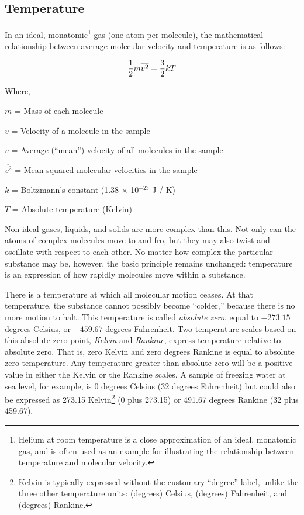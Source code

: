 \filbreak
\subsection{Temperature}

In an ideal, monatomic\footnote{Helium at room temperature is a close approximation of an ideal, monatomic gas, and is often used as an example for illustrating the relationship between temperature and molecular velocity.} gas (one atom per molecule), the mathematical relationship between average molecular velocity and temperature is as follows:

$${1 \over 2}m\overline{v^2} = {3 \over 2}kT$$

\noindent
Where,

$m$ = Mass of each molecule

$v$ = Velocity of a molecule in the sample

$\overline{v}$ = Average (``mean'') velocity of all molecules in the sample

$\overline{v^2}$ = Mean-squared molecular velocities in the sample

$k$ = Boltzmann's constant (1.38 $\times$ 10$^{-23}$ J / K)

$T$ = Absolute temperature (Kelvin)

\vskip 10pt

Non-ideal gases, liquids, and solids are more complex than this.  Not only can the atoms of complex molecules move to and fro, but they may also twist and oscillate with respect to each other.  No matter how complex the particular substance may be, however, the basic principle remains unchanged: temperature is an expression of how rapidly molecules move within a substance.  

There is a temperature at which all molecular motion ceases.  At that temperature, the substance cannot possibly become ``colder,'' because there is no more motion to halt.  This temperature is called \textit{absolute zero}, equal to $-273.15$ degrees Celsius, or $-459.67$ degrees Fahrenheit.  Two temperature scales based on this absolute zero point, \textit{Kelvin} and \textit{Rankine}, express temperature relative to absolute zero.  That is, zero Kelvin and zero degrees Rankine is equal to absolute zero temperature.  Any temperature greater than absolute zero will be a positive value in either the Kelvin or the Rankine scales.  A sample of freezing water at sea level, for example, is 0 degrees Celsius (32 degrees Fahrenheit) but could also be expressed as 273.15 Kelvin\footnote{Kelvin is typically expressed without the customary ``degree'' label, unlike the three other temperature units: (degrees) Celsius, (degrees) Fahrenheit, and (degrees) Rankine.} (0 plus 273.15) or 491.67 degrees Rankine (32 plus 459.67).          

